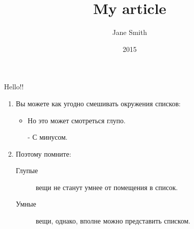 \documentclass{article}
\author{Jane Smith}
\title{My article}
\date{2015}
\begin{document}
	\maketitle
	Hello!!
	\flushleft
\begin{enumerate}
\item Вы можете как угодно 
смешивать окружения списков: 
\begin{itemize}
\item Но это может смотреться 
глупо.
\item[-] С минусом.
\end{itemize}
\item Поэтому помните:
\begin{description}
\item[Глупые] вещи не станут
умнее от помещения в список.
\item[Умные] вещи, однако,
вполне можно представить 
списком.
\end{description}
\end{enumerate}
	
\end{document}
